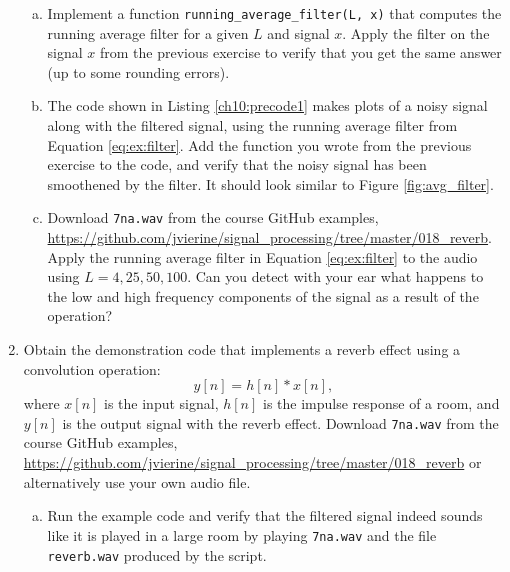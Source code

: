 \begin{enumerate}
\begin{enumerate}[a)]
          \item Implement a function \verb|running_average_filter(L, x)| that computes the running average filter
                for a given $L$ and signal $x$. Apply the filter on the signal $x$ from the previous exercise
                to verify that you get the same answer (up to some rounding errors).
          \item The code shown in Listing \ref*{ch10:precode1} makes plots of a noisy signal
                along with the filtered signal, using the running average filter from Equation \ref*{eq:ex:filter}.
                Add the function you wrote from the previous exercise to the code, and verify that the noisy
                signal has been smoothened by the filter. It should look similar to Figure \ref*{fig:avg_filter}.
                
          \item Download \verb|7na.wav| from the course GitHub examples, 
                \url{https://github.com/jvierine/signal_processing/tree/master/018_reverb}. 
                Apply the running average filter in Equation \ref{eq:ex:filter} to the audio using 
                $L = 4, 25, 50, 100$. Can you detect with your ear what happens to the
                low and high frequency components of the signal as a result of
                the operation?
        \end{enumerate}

  \item Obtain the demonstration code that implements a reverb effect
        using a convolution operation:
        \begin{equation}
          y[n] = h[n]*x[n],
        \end{equation}
        where $x[n]$ is the input signal, $h[n]$ is the impulse response
        of a room, and $y[n]$ is the output signal with the reverb
        effect. Download \verb|7na.wav| from the course GitHub examples,
        \url{https://github.com/jvierine/signal_processing/tree/master/018_reverb}
        or alternatively use your own audio file.

        \begin{enumerate}[a)]

          \item Run the example code and verify that the filtered signal indeed sounds like it
                is played in a large room by playing \verb|7na.wav| and the file \verb|reverb.wav|
                produced by the script.


\end{enumerate}
\end{enumerate}
